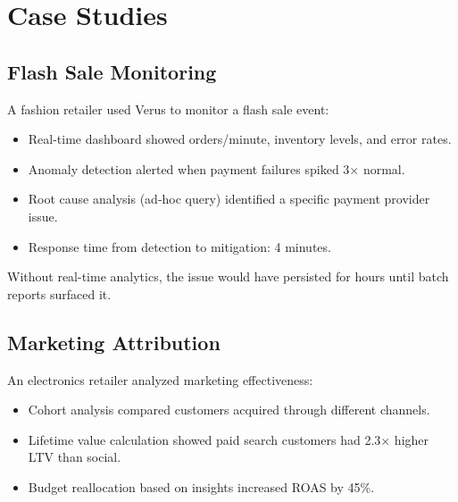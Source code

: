 \section{Case Studies}


\subsection{Flash Sale Monitoring}

A fashion retailer used Verus to monitor a flash sale event:

\begin{itemize}
\item Real-time dashboard showed orders/minute, inventory levels, and error rates.
\item Anomaly detection alerted when payment failures spiked 3$\times$ normal.
\item Root cause analysis (ad-hoc query) identified a specific payment provider issue.
\item Response time from detection to mitigation: 4 minutes.
\end{itemize}

Without real-time analytics, the issue would have persisted for hours until batch reports surfaced it.

\subsection{Marketing Attribution}

An electronics retailer analyzed marketing effectiveness:

\begin{itemize}
\item Cohort analysis compared customers acquired through different channels.
\item Lifetime value calculation showed paid search customers had 2.3$\times$ higher LTV than social.
\item Budget reallocation based on insights increased ROAS by 45\%.
\end{itemize}

